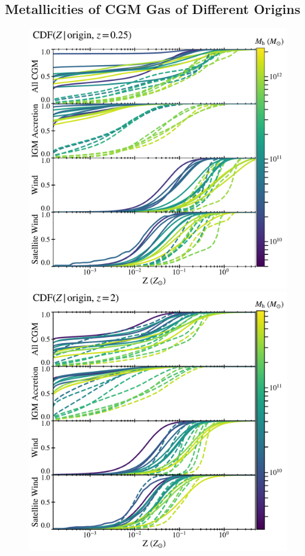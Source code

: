 \documentclass[fleqn,usenatbib]{mnras}
\begin{document}
\subsection{Metallicities of CGM Gas of Different Origins}
\label{sec:metallicity}

\begin{figure}
\centering
\begin{minipage}{0.495\textwidth}
\centering
\includegraphics[width=\textwidth]{figures/CGM_metallicity_snum465.pdf}
\end{minipage} \hfill
\begin{minipage}{0.495\textwidth}
\centering
\includegraphics[width=\textwidth]{figures/CGM_metallicity_snum172.pdf}

\end{minipage}
\end{figure}
\end{document}
